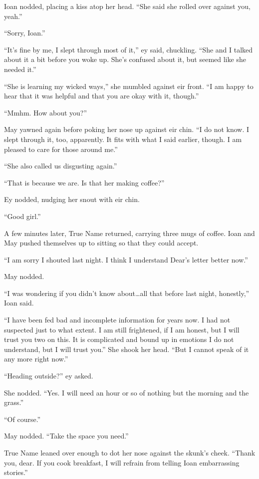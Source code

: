Ioan nodded, placing a kiss atop her head. ``She said she rolled over against you, yeah.''

``Sorry, Ioan.''

``It's fine by me, I slept through most of it,'' ey said, chuckling. ``She and I talked about it a bit before you woke up. She's confused about it, but seemed like she needed it.''

``She is learning my wicked ways,'' she mumbled against eir front. ``I am happy to hear that it was helpful and that you are okay with it, though.''

``Mmhm. How about you?''

May yawned again before poking her nose up against eir chin. ``I do not know. I slept through it, too, apparently. It fits with what I said earlier, though. I am pleased to care for those around me.''

``She also called us disgusting again.''

``That is because we are. Is that her making coffee?''

Ey nodded, nudging her snout with eir chin.

``Good girl.''

A few minutes later, True Name returned, carrying three mugs of coffee. Ioan and May pushed themselves up to sitting so that they could accept.

``I am sorry I shouted last night. I think I understand Dear's letter better now.''

May nodded.

``I was wondering if you didn't know about\ldots all that before last night, honestly,'' Ioan said.

``I have been fed bad and incomplete information for years now. I had not suspected just to what extent. I am still frightened, if I am honest, but I will trust you two on this. It is complicated and bound up in emotions I do not understand, but I will trust you.'' She shook her head. ``But I cannot speak of it any more right now.''

``Heading outside?'' ey asked.

She nodded. ``Yes. I will need an hour or so of nothing but the morning and the grass.''

``Of course.''

May nodded. ``Take the space you need.''

True Name leaned over enough to dot her nose against the skunk's cheek. ``Thank you, dear. If you cook breakfast, I will refrain from telling Ioan embarrassing stories.''

